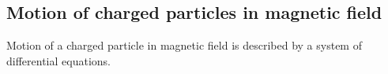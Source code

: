 \subsection{Motion of charged particles in magnetic field}
Motion of a charged particle in magnetic field is described by a system of differential equations.